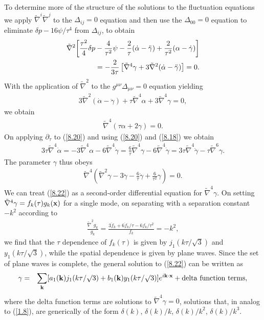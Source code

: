 To determine more of the structure of the solutions to the fluctuation equations we apply $\tilde{\nabla}^i\tilde{\nabla}^j$ to the $\Delta_{ij}=0$ equation and then use the $\Delta_{00}=0$ equation to eliminate $\delta p -16\psi/\tau^4$ from $\Delta_{ij}$, to obtain
%
\begin{eqnarray}
\tilde{\nabla}^2\bigg{[}\frac{\tau^2}{4}\delta p-\frac{4}{\tau^2}\psi-\frac{2}{\tau}(\dot{\alpha}-\ddot{\gamma})+\frac{2}{\tau^2}(\alpha-\dot{\gamma})\bigg{]}
\nonumber\\
=-\frac{2}{3\tau}\left[
\tilde{\nabla}^4\gamma+3\tilde{\nabla}^2(\dot{\alpha}-\ddot{\gamma})\right]=0.
\label{8.18}
\end{eqnarray}
% 
With the application of $\tilde{\nabla}^2$ to the $g^{\mu\nu}\Delta_{\mu\nu}=0$ equation yielding
%
\begin{eqnarray}
3\tilde{\nabla}^2(\dot{\alpha}-\ddot{\gamma})+\tau \tilde{\nabla}^4\alpha+3\tilde{\nabla}^4\gamma=0,
\label{8.19}
\end{eqnarray}
% 
we obtain
%
\begin{eqnarray}
\tilde{\nabla}^4(\tau \alpha+2\gamma)=0.
\label{8.20}
\end{eqnarray}
% 
On applying $\partial_{\tau}$ to (\ref{8.20}) and using (\ref{8.20}) and (\ref{8.18}) we obtain
%
\begin{eqnarray}
3\tau\tilde{\nabla}^4\dot{\alpha}=-3\tilde{\nabla}^4\alpha-6\tilde{\nabla}^4\dot{\gamma}
=\frac{6}{\tau}\tilde{\nabla}^4\gamma-6\tilde{\nabla}^4\dot{\gamma}
=3\tau\tilde{\nabla}^4\ddot{\gamma}-\tau\tilde{\nabla}^6\gamma.
\label{8.21}
\end{eqnarray}
%
The parameter $\gamma$ thus obeys
%
\begin{eqnarray}
\tilde{\nabla}^4\left(\tilde{\nabla}^2\gamma-3\ddot{\gamma}-\frac{6}{\tau}\dot{\gamma}+\frac{6}{\tau^2}\gamma\right)=0.
\label{8.22}
\end{eqnarray}
%
We can treat (\ref{8.22})  as a second-order differential equation for $\tilde{\nabla}^4\gamma$.
On setting $\tilde{\nabla}^4\gamma=f_k(\tau)g_k({\bf x})$ for a single mode, on separating  with a separation constant $-k^2$ according to
%
\begin{eqnarray}
\frac{\tilde{\nabla}^2g_k}{g_k}=\frac{3\ddot{f}_k+6\dot{f}_k/\tau-6f_k/\tau^2}{f_k}=-k^2,
\label{8.23}
\end{eqnarray}
%
we find that the $\tau$ dependence of $f_k(\tau)$ is given by $j_1(k\tau/\surd{3})$ and $y_1(k\tau/\surd{3})$, while the spatial dependence is given by plane waves. Since the set of plane waves is complete, the general solution to (\ref{8.22}) can be written as
%
\begin{eqnarray}
\gamma&=&\sum_{\bf k}[a_1({\bf k})j_1(k\tau/\surd{3})+b_1({\bf k})y_1(k\tau/\surd{3})]e^{i{\bf k}\cdot{\bf x}} +{\rm delta~function~terms},
\nonumber\\
\label{8.24}
\end{eqnarray}
%
where the delta function terms are solutions to $\tilde{\nabla}^4\gamma=0$, solutions that, in analog to  (\ref{1.8}),  are generically of the form $\delta(k)$, $\delta(k)/k$, $\delta(k)/k^2$, $\delta(k)/k^3$.


